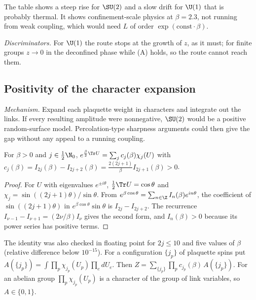 The table shows a steep rise for $\SU(2)$ and a slow drift for $\U(1)$ that is probably thermal.
It shows confinement-scale physics at $\beta=2.3$, not running from weak coupling, which would
need $L$ of order $\exp(\mathrm{const}\cdot\beta)$.

\emph{Discriminators.} For $\U(1)$ the route stops at the growth of $z$, as it must; for finite
groups $z\to0$ in the deconfined phase while (A) holds, so the route cannot reach them.

\subsection{Positivity of the character expansion}\label{neg:sub-dual}

\emph{Mechanism.} Expand each plaquette weight in characters and integrate out the links. If
every resulting amplitude were nonnegative, $\SU(2)$ would be a positive random-surface model.
Percolation-type sharpness arguments could then give the gap without any appeal to a running
coupling.

\begin{lemma}\label{neg:lem-cj}
For $\beta>0$ and $j\in\frac12\N_0$,
$e^{\frac\beta2\Tr U}=\sum_jc_j(\beta)\chi_j(U)$ with
$c_j(\beta)=I_{2j}(\beta)-I_{2j+2}(\beta)=\frac{2(2j+1)}{\beta}I_{2j+1}(\beta)>0$.
\end{lemma}

\begin{proof}
For $U$ with eigenvalues $e^{\pm i\theta}$, $\frac12\Tr U=\cos\theta$ and
$\chi_j=\sin((2j+1)\theta)/\sin\theta$. From $e^{\beta\cos\theta}=\sum_{n\in\Z}I_n(\beta)e^{in\theta}$,
the coefficient of $\sin((2j+1)\theta)$ in $e^{\beta\cos\theta}\sin\theta$ is $I_{2j}-I_{2j+2}$.
The recurrence $I_{\nu-1}-I_{\nu+1}=(2\nu/\beta)I_\nu$ gives the second form, and $I_n(\beta)>0$
because its power series has positive terms.
\end{proof}

The identity was also checked in floating point for $2j\le10$ and five values of $\beta$
(relative difference below $10^{-15}$). For a configuration $\{j_p\}$ of plaquette spins put
$A(\{j_p\})=\int\prod_p\chi_{j_p}(U_p)\prod_e dU_e$. Then
$Z=\sum_{\{j_p\}}\prod_pc_{j_p}(\beta)\,A(\{j_p\})$. For an abelian group $\prod_p\chi_{j_p}(U_p)$
is a character of the group of link variables, so $A\in\{0,1\}$.

